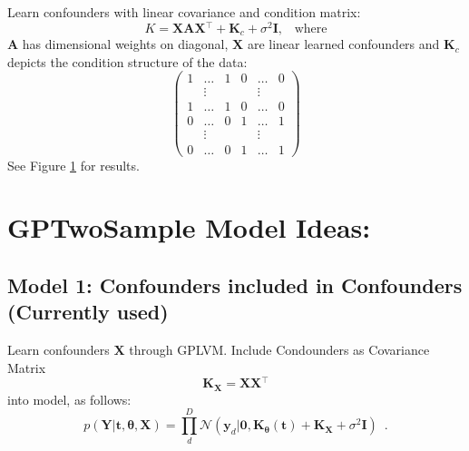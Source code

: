 \documentclass[a4paper,tablecaptionabove]{article}
\newcommand{\matr}[1]{\ensuremath{\mathbf{#1}}}
\newcommand{\T}{\ensuremath{^\top}}
\begin{document}
Learn confounders with linear covariance and condition matrix:
\begin{equation}
  \label{eq:4}
  K = \matr{XAX}\T + \matr K_c + \sigma^2\matr I,\enspace\text{ where}
\end{equation}
$\matr A$ has dimensional weights on diagonal, $\matr X$ are linear
learned confounders and $\matr K_c$ depicts the condition structure of
the data:
\begin{equation}
  \label{eq:8}
  \left(
  \begin{matrix}
    1&\hdots&1&0&\hdots&0\\
    &\vdots&&&\vdots&\\
    1&\hdots&1&0&\hdots&0\\
    0&\hdots&0&1&\hdots&1\\
    &\vdots&&&\vdots&\\
    0&\hdots&0&1&\hdots&1
  \end{matrix}
  \right)
\end{equation}
See Figure \ref{fig:linear-conf-matr} for results.

\begin{figure}[h]
  \centering
  \hfill
  \hfill
  \caption{\subsectionname}
  \label{fig:linear-conf-matr}
\end{figure}


\section{GPTwoSample Model Ideas:}
\label{sec:model-ideas}

\subsection{Model 1: Confounders included in Confounders (Currently used)}
\label{sec:model-1:-covariance}

Learn confounders $\matr{X}$ through GPLVM. Include Condounders as
Covariance Matrix
\begin{equation}
  \label{eq:1}
  \matr K_{\matr X} = \matr X\matr X\T
\end{equation}
into model, as follows:
\begin{equation}
  \label{eq:2}
  p(\matr Y|\matr t,\matr \theta,\matr X) = \prod_d^D\mathcal N(\matr y_d|\matr 0, \matr K_{\matr\theta}(\matr t) + \matr K_{\matr X}+\sigma^2\matr I)\enspace.
\end{equation}
\end{document}

